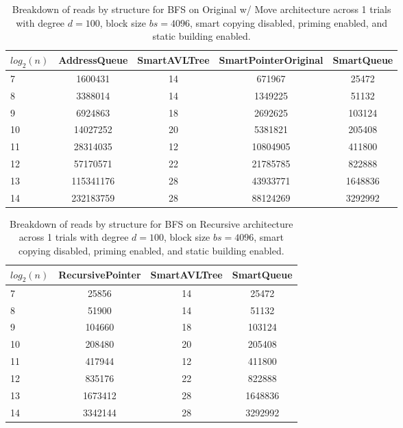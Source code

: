 \begin{table}[]
\centering
\begin{tabular}{|l|c|c|c|c|}
$log_2(n)$ & AddressQueue & SmartAVLTree & SmartPointerOriginal & SmartQueue \\ \hline
7 & 1600431 & 14 & 671967 & 25472 \\ \hline
8 & 3388014 & 14 & 1349225 & 51132 \\ \hline
9 & 6924863 & 18 & 2692625 & 103124 \\ \hline
10 & 14027252 & 20 & 5381821 & 205408 \\ \hline
11 & 28314035 & 12 & 10804905 & 411800 \\ \hline
12 & 57170571 & 22 & 21785785 & 822888 \\ \hline
13 & 115341176 & 28 & 43933771 & 1648836 \\ \hline
14 & 232183759 & 28 & 88124269 & 3292992 \\ \hline
\end{tabular}
\caption{Breakdown of reads by structure for BFS on Original w/ Move architecture across 1 trials with degree $d=100$, block size $bs=4096$, smart copying disabled, priming enabled, and static building enabled.}
    \label{tab:reads_by_structure_bfs_d100_bs4096_trials1_copiesfalse_primetrue_staticinsertiontrue_ptoriginal_movetrue}
\end{table}

\begin{table}[]
\centering
\begin{tabular}{|l|c|c|c|}
$log_2(n)$ & RecursivePointer & SmartAVLTree & SmartQueue \\ \hline
7 & 25856 & 14 & 25472 \\ \hline
8 & 51900 & 14 & 51132 \\ \hline
9 & 104660 & 18 & 103124 \\ \hline
10 & 208480 & 20 & 205408 \\ \hline
11 & 417944 & 12 & 411800 \\ \hline
12 & 835176 & 22 & 822888 \\ \hline
13 & 1673412 & 28 & 1648836 \\ \hline
14 & 3342144 & 28 & 3292992 \\ \hline
\end{tabular}
\caption{Breakdown of reads by structure for BFS on Recursive architecture across 1 trials with degree $d=100$, block size $bs=4096$, smart copying disabled, priming enabled, and static building enabled.}
    \label{tab:reads_by_structure_bfs_d100_bs4096_trials1_copiesfalse_primetrue_staticinsertiontrue_ptrecursive_movetrue}
\end{table}


